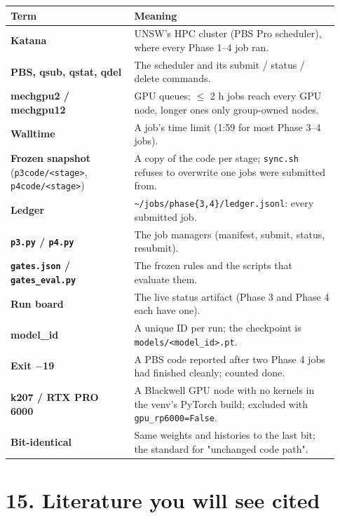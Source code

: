 \documentclass[11pt]{article}
\begin{document}
\begin{center}\small\begin{tabular}{>{\raggedright\arraybackslash}p{0.351\linewidth}>{\raggedright\arraybackslash}p{0.583\linewidth}}
\toprule
Term & Meaning \\
\midrule
\textbf{Katana} & UNSW's HPC cluster (PBS Pro scheduler), where every Phase 1--4 job ran. \\
\textbf{PBS, qsub, qstat, qdel} & The scheduler and its submit / status / delete commands. \\
\textbf{mechgpu2 / mechgpu12} & GPU queues; $\leq$ 2 h jobs reach every GPU node, longer ones only group-owned nodes. \\
\textbf{Walltime} & A job's time limit (1:59 for most Phase 3--4 jobs). \\
\textbf{Frozen snapshot} (\texttt{p3code/\allowbreak{}<stage>}, \texttt{p4code/\allowbreak{}<stage>}) & A copy of the code per stage; \texttt{sync.sh} refuses to overwrite one jobs were submitted from. \\
\textbf{Ledger} & \texttt{\textasciitilde{}/\allowbreak{}jobs/\allowbreak{}phase\{3,\allowbreak{}4\}/\allowbreak{}ledger.\allowbreak{}jsonl}: every submitted job. \\
\textbf{\texttt{p3.py} / \texttt{p4.py}} & The job managers (manifest, submit, status, resubmit). \\
\textbf{\texttt{gates.json} / \texttt{gates\_eval.py}} & The frozen rules and the scripts that evaluate them. \\
\textbf{Run board} & The live status artifact (Phase 3 and Phase 4 each have one). \\
\textbf{model\_id} & A unique ID per run; the checkpoint is \texttt{models/\allowbreak{}<model\_\allowbreak{}id>.\allowbreak{}pt}. \\
\textbf{Exit $-$19} & A PBS code reported after two Phase 4 jobs had finished cleanly; counted done. \\
\textbf{k207 / RTX PRO 6000} & A Blackwell GPU node with no kernels in the venv's PyTorch build; excluded with \texttt{gpu\_\allowbreak{}rp6000=False}. \\
\textbf{Bit-identical} & Same weights and histories to the last bit; the standard for "unchanged code path". \\
\bottomrule
\end{tabular}\end{center}



\section*{15. Literature you will see cited}
\end{document}
